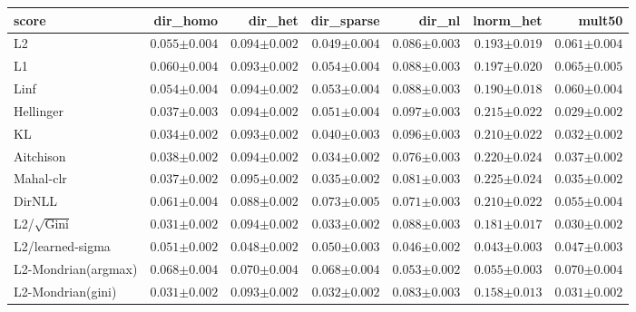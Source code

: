 \begin{tabular}{lrrrrrr}
\toprule
score & dir\_homo & dir\_het & dir\_sparse & dir\_nl & lnorm\_het & mult50 \\
\midrule
L2 & $0.055{\scriptstyle\pm0.004}$ & $0.094{\scriptstyle\pm0.002}$ & $0.049{\scriptstyle\pm0.004}$ & $0.086{\scriptstyle\pm0.003}$ & $0.193{\scriptstyle\pm0.019}$ & $0.061{\scriptstyle\pm0.004}$ \\
L1 & $0.060{\scriptstyle\pm0.004}$ & $0.093{\scriptstyle\pm0.002}$ & $0.054{\scriptstyle\pm0.004}$ & $0.088{\scriptstyle\pm0.003}$ & $0.197{\scriptstyle\pm0.020}$ & $0.065{\scriptstyle\pm0.005}$ \\
Linf & $0.054{\scriptstyle\pm0.004}$ & $0.094{\scriptstyle\pm0.002}$ & $0.053{\scriptstyle\pm0.004}$ & $0.088{\scriptstyle\pm0.003}$ & $0.190{\scriptstyle\pm0.018}$ & $0.060{\scriptstyle\pm0.004}$ \\
Hellinger & $0.037{\scriptstyle\pm0.003}$ & $0.094{\scriptstyle\pm0.002}$ & $0.051{\scriptstyle\pm0.004}$ & $0.097{\scriptstyle\pm0.003}$ & $0.215{\scriptstyle\pm0.022}$ & $\mathbf{0.029}{\scriptstyle\pm0.002}$ \\
KL & $0.034{\scriptstyle\pm0.002}$ & $0.093{\scriptstyle\pm0.002}$ & $0.040{\scriptstyle\pm0.003}$ & $0.096{\scriptstyle\pm0.003}$ & $0.210{\scriptstyle\pm0.022}$ & $0.032{\scriptstyle\pm0.002}$ \\
Aitchison & $0.038{\scriptstyle\pm0.002}$ & $0.094{\scriptstyle\pm0.002}$ & $0.034{\scriptstyle\pm0.002}$ & $0.076{\scriptstyle\pm0.003}$ & $0.220{\scriptstyle\pm0.024}$ & $0.037{\scriptstyle\pm0.002}$ \\
Mahal-clr & $0.037{\scriptstyle\pm0.002}$ & $0.095{\scriptstyle\pm0.002}$ & $0.035{\scriptstyle\pm0.002}$ & $0.081{\scriptstyle\pm0.003}$ & $0.225{\scriptstyle\pm0.024}$ & $0.035{\scriptstyle\pm0.002}$ \\
DirNLL & $0.061{\scriptstyle\pm0.004}$ & $0.088{\scriptstyle\pm0.002}$ & $0.073{\scriptstyle\pm0.005}$ & $0.071{\scriptstyle\pm0.003}$ & $0.210{\scriptstyle\pm0.022}$ & $0.055{\scriptstyle\pm0.004}$ \\
L2/$\sqrt{\mathrm{Gini}}$ & $0.031{\scriptstyle\pm0.002}$ & $0.094{\scriptstyle\pm0.002}$ & $0.033{\scriptstyle\pm0.002}$ & $0.088{\scriptstyle\pm0.003}$ & $0.181{\scriptstyle\pm0.017}$ & $0.030{\scriptstyle\pm0.002}$ \\
L2/learned-sigma & $0.051{\scriptstyle\pm0.002}$ & $\mathbf{0.048}{\scriptstyle\pm0.002}$ & $0.050{\scriptstyle\pm0.003}$ & $\mathbf{0.046}{\scriptstyle\pm0.002}$ & $\mathbf{0.043}{\scriptstyle\pm0.003}$ & $0.047{\scriptstyle\pm0.003}$ \\
L2-Mondrian(argmax) & $0.068{\scriptstyle\pm0.004}$ & $0.070{\scriptstyle\pm0.004}$ & $0.068{\scriptstyle\pm0.004}$ & $0.053{\scriptstyle\pm0.002}$ & $0.055{\scriptstyle\pm0.003}$ & $0.070{\scriptstyle\pm0.004}$ \\
L2-Mondrian(gini) & $\mathbf{0.031}{\scriptstyle\pm0.002}$ & $0.093{\scriptstyle\pm0.002}$ & $\mathbf{0.032}{\scriptstyle\pm0.002}$ & $0.083{\scriptstyle\pm0.003}$ & $0.158{\scriptstyle\pm0.013}$ & $0.031{\scriptstyle\pm0.002}$ \\
\bottomrule
\end{tabular}